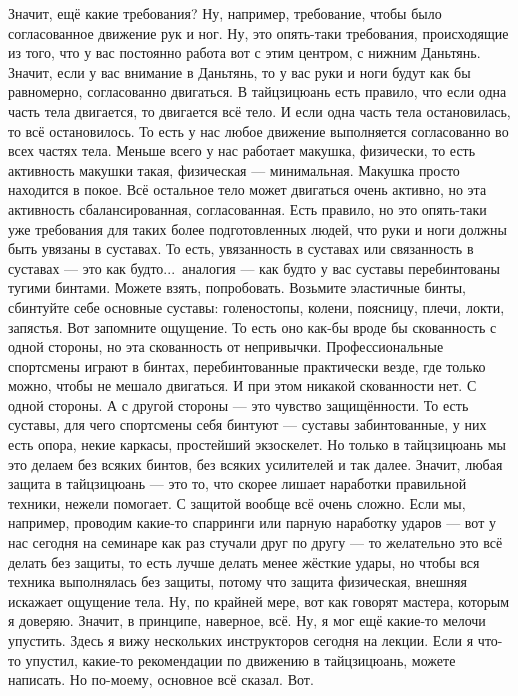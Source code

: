 Значит, ещё какие требования? Ну,
например, требование, чтобы было согласованное движение рук и ног. Ну, это опять-таки
требования, происходящие из того, что у вас постоянно работа вот с этим центром, с нижним
Даньтянь. Значит, если у вас внимание в Даньтянь, то у вас руки и ноги будут как бы равномерно,
согласованно двигаться. В тайцзицюань есть правило, что если одна часть тела двигается, то
двигается всё тело. И если одна часть тела остановилась, то всё остановилось. То есть у нас любое
движение выполняется согласованно во всех частях тела. Меньше всего у нас работает макушка,
физически, то
есть активность макушки такая, физическая --- минимальная. Макушка просто находится в покое. Всё
остальное тело может двигаться очень активно, но эта активность сбалансированная,
согласованная. Есть правило, но это опять-таки уже требования для таких более подготовленных
людей, что руки и ноги должны быть увязаны в суставах. То есть, увязанность в суставах или
связанность в суставах --- это как будто...\ аналогия --- как будто у вас суставы перебинтованы
тугими
бинтами. Можете взять, попробовать. Возьмите эластичные бинты, сбинтуйте себе основные суставы:
голеностопы, колени, поясницу, плечи, локти, запястья. Вот запомните ощущение. То есть оно как-бы
вроде бы скованность с одной стороны, но эта скованность от непривычки. Профессиональные
спортсмены играют в бинтах, перебинтованные практически везде, где только можно, чтобы не
мешало двигаться. И при этом никакой скованности нет. С одной стороны. А с другой стороны --- это
чувство защищённости. То есть суставы, для чего спортсмены себя бинтуют --- суставы
забинтованные, у них есть опора, некие каркасы, простейший экзоскелет. Но только в тайцзицюань
мы это делаем без всяких бинтов, без всяких усилителей и так далее. Значит, любая защита в
тайцзицюань --- это то, что скорее лишает наработки правильной техники, нежели помогает. С
защитой вообще всё очень сложно. Если мы, например, проводим какие-то спарринги или парную
наработку ударов --- вот у нас сегодня на семинаре как раз стучали друг по другу --- то желательно
это всё делать без защиты, то есть лучше делать менее жёсткие удары, но чтобы вся техника
выполнялась без защиты, потому что защита физическая, внешняя искажает ощущение тела. Ну, по
крайней мере, вот как говорят мастера, которым я доверяю. Значит, в принципе, наверное, всё.
Ну, я мог ещё какие-то мелочи упустить. Здесь я вижу нескольких инструкторов сегодня на лекции.
Если я что-то упустил, какие-то
рекомендации по движению в тайцзицюань, можете написать. Но по-моему, основное всё сказал. Вот.

